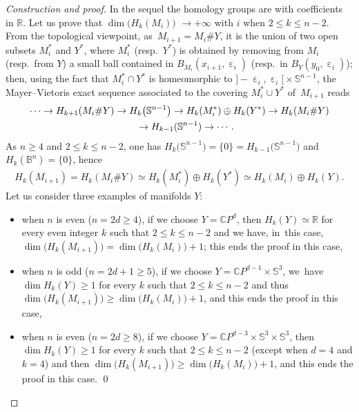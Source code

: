 \documentclass[pdftex]{sigma}
\numberwithin{equation}{section}
\newcommand{\R}{\mathbb{R}}
\newcommand{\C}{\mathbb{C}}
\newcommand{\f}{\rightarrow}
\newcommand{\e}{\operatorname{\varepsilon}}
\begin{document}
\begin{proof}[Construction and proof]
In the sequel the homology groups are with coefficients in $\R$. Let us prove that $\dim \big( H_k (M_i) \big)$ $\f + \infty$ with $i$ when $ 2 \le k \le n-2$.
From the topological viewpoint, as~$M_{i+1} = M_i \# Y$, it is the union of two open subsets $M_i^*$ and $Y^*$, where $M_i^*$ (resp.\ $Y^*$) is
obtained
by removing from $M_i$ (resp.\ from $Y$) a small ball contained in $B_{M_i} (x_{i+1}, \e_i)$ (resp.\ in $B_Y (y_0, \e_i)$); then, using the fact that
$M_i^* \cap Y^*$ is homeomorphic to $]{-} \e_i, \e_i[{} \times \mathbb S^{n-1}$, the Mayer--Vietoris exact
sequence associated to the covering $M_i^*\cup Y^*$ of~$M_{i+1}$
reads
\begin{gather*}
\cdots \f H_{k+1} (M_i \# Y) \f H_k \big(\mathbb S^{n-1}\big) \f H_k ( M_i^*) \oplus H_k (Y^*) \f H_k (M_i \# Y)
\\ \hphantom{\cdots}
\f H_{k-1} (\mathbb S^{n-1})\f \cdots.
\end{gather*}
As $ n \ge 4$ and $2 \le k \le n-2$, one has $H_{k} \big(\mathbb S^{n-1}\big) =
\{0\} = H_{k-1} \big(\mathbb S^{n-1}\big)$ and $H_{k} (\mathbb B^{n}) = \{0\}$, hence
\begin{gather*}
H_k (M_{i+1}) = H_k (M_i \# Y) \simeq H_k ( M_i^*) \oplus H_k (Y^*) \simeq H_k ( M_i) \oplus H_k (Y).
\end{gather*}
Let us consider three examples of manifolds $Y$:

\begin{itemize}\itemsep=0pt
\item when $n$ is even ($n = 2 d \ge 4$), if we choose $Y = \C P^d$, then $H_k (Y) \simeq \R$ for every even integer $k$ such that $ 2 \le k \le n-2$ and
we have, in~this case,
$\dim \big( H_k (M_{i+1})\big) = \dim \big( H_k (M_{i})\big) + 1$; this ends the proof in this case,

\item when $n$ is odd ($n = 2 d + 1\ge 5$), if we choose $Y = \C P^{d-1} \times \mathbb S^3$, we~have $\dim H_k (Y) \ge 1 $ for every
$k$ such that $ 2 \le k \le n-2$ and thus
$\dim \big( H_k (M_{i+1})\big) \ge \dim \big( H_k (M_{i})\big) + 1$,
and this ends the proof in this case,

\item when $n$ is even ($n = 2 d \ge 8$), if we choose $Y = \C P^{d-3} \times \mathbb S^3 \times \mathbb S^3$, then $\dim H_k (Y) \ge 1 $ for
every $k$
such that $ 2 \le k \le n-2$ (except when $d = 4$ and $ k = 4$) and then $\dim \big( H_k (M_{i+1})\big) \ge \dim \big( H_k (M_{i})\big) + 1$, and this ends the proof in this case.
\hfill \qed
\end{itemize}\renewcommand{\qed}{}
\end{proof}
\end{document}
